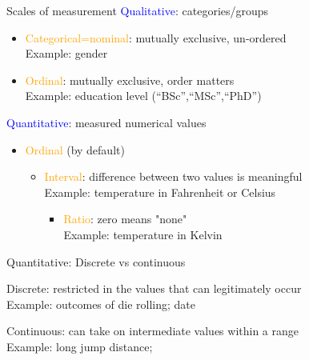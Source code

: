 \documentclass{beamer}
\begin{document}
\begin{frame}{Scales of measurement}
\textcolor{blue}{Qualitative}: categories/groups 
\begin{itemize}
\item[$\rhd$]  \textcolor{orange}{Categorical=nominal}: mutually exclusive, un-ordered\\
Example: gender
\item[$\rhd$] \textcolor{orange}{Ordinal}: mutually exclusive, order matters\\
Example: education level (“BSc”,“MSc”,“PhD”)
\end{itemize}

\textcolor{blue}{Quantitative}: measured numerical values
\begin{itemize}
\item[$\rhd$] \textcolor{orange}{Ordinal} (by default)
\begin{itemize}
\item[$\rhd$] \textcolor{orange}{Interval}:  difference between two values is meaningful\\
Example: temperature in Fahrenheit or Celsius
\begin{itemize}
\item[$\rhd$] \textcolor{orange}{Ratio}:  zero means "none"\\
Example: temperature in Kelvin 
\end{itemize}
\end{itemize}
\end{itemize}
\end{frame}

\begin{frame}{Quantitative: Discrete vs continuous }

Discrete: restricted in the values that can
legitimately occur\\
Example: outcomes of die rolling; date

Continuous: can take on intermediate values within a
range\\
Example: long jump distance;


\end{frame}
\end{document}
